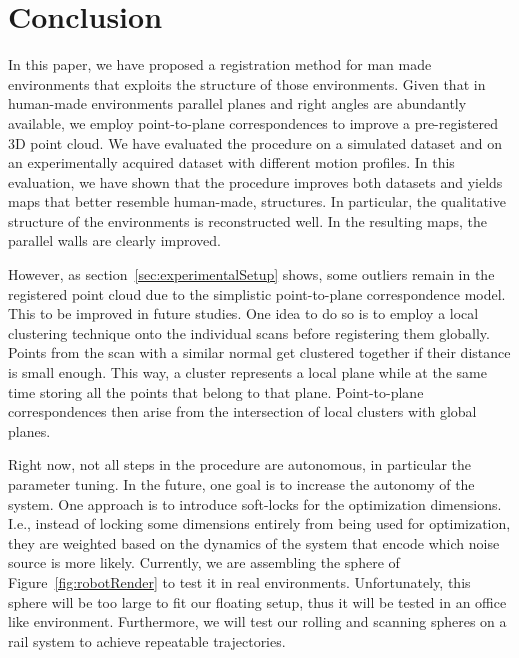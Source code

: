 \section{Conclusion}

In this paper, we have proposed a registration method for man made environments that exploits the structure of those environments. 
Given that in human-made environments parallel planes and right angles are abundantly available, we employ point-to-plane correspondences to improve a pre-registered 3D point cloud. 
We have evaluated the procedure on a simulated dataset and on an experimentally acquired dataset with different motion profiles. 
In this evaluation, we have shown that the procedure improves both datasets and yields maps that better resemble human-made, structures. 
In particular, the qualitative structure of the environments is reconstructed well. 
In the resulting maps, the parallel walls are clearly improved.

However, as section~\ref{sec:experimentalSetup} shows, some outliers remain in the registered point cloud due to the simplistic point-to-plane correspondence model.
This to be improved in future studies.
One idea to do so is to employ a local clustering technique onto the individual scans before registering them globally. 
Points from the scan with a similar normal get clustered together if their distance is small enough.
This way, a cluster represents a local plane while at the same time storing all the points that belong to that plane.
Point-to-plane correspondences then arise from the intersection of local clusters with global planes.

%
Right now, not all steps in the procedure are autonomous, in particular the parameter tuning. 
In the future, one goal is to increase the autonomy of the system.
One approach is to introduce soft-locks for the optimization dimensions.
I.e., instead of locking some dimensions entirely from being used for optimization, they are weighted based on the dynamics of the system that encode which noise source is more likely.  
%
Currently, we are assembling the sphere of Figure~\ref{fig:robotRender} to test it in real environments.
Unfortunately, this sphere will be too large to fit our floating setup, thus it will be tested in an office like environment.
Furthermore, we will test our rolling and scanning spheres on a rail system to achieve repeatable trajectories. 
